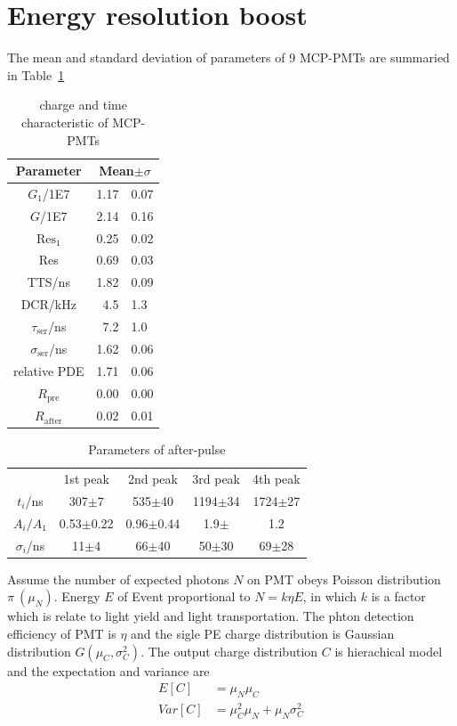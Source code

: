 \section{Energy resolution boost}
\label{Result}
The mean and standard deviation of parameters of 9 MCP-PMTs are summaried in Table~\ref{tab:summary}
\begin{table}
    \centering
    \caption{charge and time characteristic of MCP-PMTs}
    \label{tab:summary}
    \begin{tabular}{c| r @{$\pm$} l}
        Parameter&\multicolumn{2}{c}{Mean$\pm\sigma$}\\
        \hline
        $G_1$/1E7&1.17&0.07\\
        $G$/1E7&2.14&0.16\\
        $\mathrm{Res}_1$&0.25&0.02\\
        Res&0.69&0.03\\
        TTS/ns&1.82&0.09\\
        DCR/kHz&4.5&1.3\\
        $\tau_{\mathrm{ser}}$/ns&7.2&1.0\\
        $\sigma_{\mathrm{ser}}$/ns&1.62&0.06\\
        relative PDE&1.71&0.06\\
        $R_{\mathrm{pre}}$&0.00&0.00\\
        $R_{\mathrm{after}}$&0.02&0.01\\
        \hline
    \end{tabular}
\end{table}
\begin{table}
    \centering
    \caption{Parameters of after-pulse}
    \label{tab:afterpulse}
    \begin{tabular}{c|c|c|c|c}
        \hline
        &1st peak&2nd peak&3rd peak&4th peak\\
        $t_i$/ns&307$\pm$7&535$\pm$40&1194$\pm$34&1724$\pm$27\\
        $A_i/A_1$&0.53$\pm$0.22&0.96$\pm$0.44&1.9$\pm$&1.2\\
        $\sigma_i$/ns&11$\pm$4&66$\pm$40&50$\pm$30&69$\pm$28\\
        \hline
    \end{tabular}
\end{table}
Assume the number of expected photons $N$ on PMT obeys Poisson distribution $\pi~(\mu_N)$. Energy $E$ of Event proportional to $N=k\eta E$, in which $k$ is a factor which is relate to light yield and light transportation. The phton detection efficiency of PMT is $\eta$ and the sigle PE charge distribution is Gaussian distribution $G(\mu_C,\sigma_C^2)$. The output charge distribution $C$ is hierachical model and the expectation and variance are
\begin{align}
    E[C]&=\mu_N\mu_C\\
    Var[C]&=\mu_C^2\mu_N+\mu_N\sigma_C^2
\end{align}

